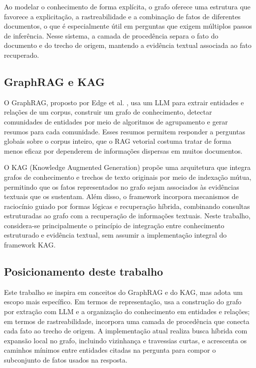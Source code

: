 Ao modelar o conhecimento de forma explícita, o grafo oferece uma estrutura que favorece a explicitação, a rastreabilidade e a combinação de fatos de diferentes documentos, o que é especialmente útil em perguntas que exigem múltiplos passos de inferência. Nesse sistema, a camada de procedência separa o fato do documento e do trecho de origem, mantendo a evidência textual associada ao fato recuperado.

\subsection{GraphRAG e KAG}

O GraphRAG, proposto por Edge et al. \cite{edge2024graphrag}, usa um LLM para extrair entidades e relações de um corpus, construir um grafo de conhecimento, detectar comunidades de entidades por meio de algoritmos de agrupamento e gerar resumos para cada comunidade. Esses resumos permitem responder a perguntas globais sobre o corpus inteiro, que o RAG vetorial costuma tratar de forma menos eficaz por dependerem de informações dispersas em muitos documentos.

O KAG (Knowledge Augmented Generation) \cite{liang2024kag} propõe uma arquitetura que integra grafos de conhecimento e trechos de texto originais por meio de indexação mútua, permitindo que os fatos representados no grafo sejam associados às evidências textuais que os sustentam. Além disso, o framework incorpora mecanismos de raciocínio guiado por formas lógicas e recuperação híbrida, combinando consultas estruturadas ao grafo com a recuperação de informações textuais. Neste trabalho, considera-se principalmente o princípio de integração entre conhecimento estruturado e evidência textual, sem assumir a implementação integral do framework KAG.

\subsection{Posicionamento deste trabalho}

Este trabalho se inspira em conceitos do GraphRAG e do KAG, mas adota um escopo mais específico. Em termos de representação, usa a construção do grafo por extração com LLM e a organização do conhecimento em entidades e relações; em termos de rastreabilidade, incorpora uma camada de procedência que conecta cada fato ao trecho de origem. A implementação atual realiza busca híbrida com expansão local no grafo, incluindo vizinhança e travessias curtas, e acrescenta os caminhos mínimos entre entidades citadas na pergunta para compor o subconjunto de fatos usados na resposta.

